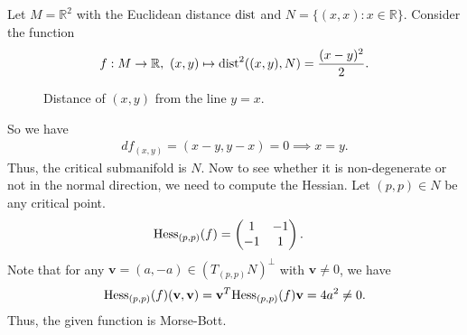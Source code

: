 \begin{eg}\label{eg:MorseBottDistanceSquaredFromLine}
    Let $M=\mathbb{R}^2$ with the Euclidean distance $\operatorname{dist}$  and $N=\{(x,x):x\in \mathbb{R}\}$. Consider the function 
    \begin{displaymath}
        f:M\to \mathbb{R},~(x,y)\mapsto \operatorname{dist}^2((x,y),N)= \dfrac{(x-y)^2}{2}.
    \end{displaymath} 
    \begin{figure}[H]
        \centering
        \caption{Distance of $(x,y)$ from the line $y=x$.}
        \label{fig:MorseBottDistanceSquaredFromLine}
    \end{figure}
    \noindent So we have
    \begin{align*}
        df_{(x,y)} = \left(x-y,y-x\right) = 0 \implies x=y.
    \end{align*}
    Thus, the critical submanifold is $N$. Now to see whether it is non-degenerate or not in the normal direction, we need to compute the Hessian. Let $(p,p)\in N$ be any critical point. 
    \begin{align*}
        \mathrm{Hess}_{(p,p)}(f) & = 
        \begin{pmatrix}
            1 & -1 \\
            -1 & 1
        \end{pmatrix}.
    \end{align*}
    Note that for any $\mathbf{v}=(a,-a)\in \left(T_{(p,p)}N\right)^\perp$ with $\mathbf{v}\neq 0$, we have
    \begin{displaymath}
        \mathrm{Hess}_{(p,p)}(f)(\mathbf{v},\mathbf{v})= \mathbf{v}^T \mathrm{Hess}_{(p,p)}(f) \mathbf{v} = 4a^2\neq 0.
    \end{displaymath} 
    Thus, the given function is Morse-Bott.
\end{eg}
